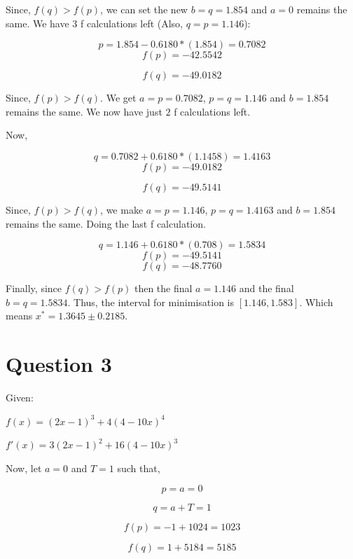 \documentclass[a4paper]{article}
\begin{document}
Since, $f(q) > f(p)$, we can set the new $b = q = 1.854$ and $a = 0$ remains the same. We have $3$ f calculations left (Also, $q = p = 1.146$):

\begin{equation}
p = 1.854  - 0.6180*(1.854) = 0.7082
\end{equation}
\begin{equation}
f(p) = -42.5542
\end{equation}

\begin{equation}
f(q) = -49.0182
\end{equation}

Since, $f(p) > f(q)$. We get $a = p = 0.7082 $, $p = q = 1.146$ and $b = 1.854$ remains the same. We now have just $2$ f calculations left. 

Now, 

\begin{equation}
q = 0.7082 + 0.6180*(1.1458) = 1.4163
\end{equation}
\begin{equation}
f(p) = -49.0182
\end{equation}

\begin{equation}
f(q) = -49.5141
\end{equation}

Since, $f(p) > f(q)$, we make $a = p = 1.146$, $p = q = 1.4163$ and $b = 1.854$ remains the same. Doing the last f calculation. 

\begin{equation}
q = 1.146 + 0.6180*(0.708) = 1.5834
\end{equation}
\begin{equation}
f(p) = -49.5141
\end{equation}
\begin{equation}
f(q) = -48.7760
\end{equation}

Finally, since $f(q) > f(p)$ then the final $a = 1.146$ and the final $b = q = 1.5834$. Thus, the interval for minimisation is $[1.146, 1.583]$.  Which means $x^* = 1.3645 \pm 0.2185$.

\section*{Question 3}

Given:

$
f(x) = (2x − 1)^3 + 4(4 − 10x)^4
$

$f'(x) = 3(2x - 1)^2 + 16(4 - 10x)^3$

Now, let  $a = 0$ and $T = 1$ such that, 

\begin{equation}
p = a = 0
\end{equation}

\begin{equation}
q = a + T = 1
\end{equation}

\begin{equation}
f(p) = -1 + 1024 = 1023
\end{equation}

\begin{equation}
f(q) = 1 + 5184  = 5185
\end{equation}
\end{document}
